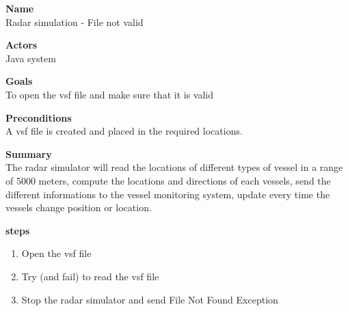 \noindent
{\bf Name}\\
Radar simulation - File not valid 

\noindent
{\bf Actors}\\
Java system 

\noindent
{\bf Goals}\\
To open the vsf file and make sure that it is valid 

\noindent
{\bf Preconditions }\\
A vsf file is created and placed in the required locations.

\noindent
{\bf Summary }\\
The radar simulator will read the locations of different types of vessel in a range of 5000 meters,
compute the locations and directions of each vessels, send the different informations to the vessel monitoring system, update every time the vessels change position or location.

\noindent
{\bf steps }\\
\begin{enumerate}
\item Open the vsf file 
\item Try (and fail) to read the vsf file 
\item Stop the radar simulator and send File Not Found Exception 
\end{enumerate} 
